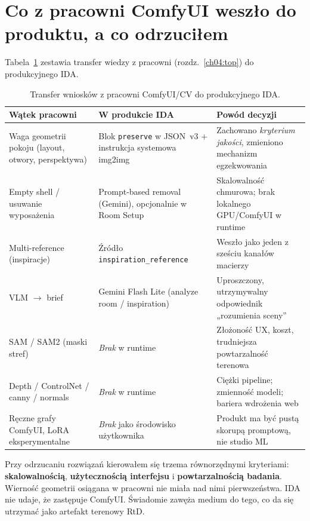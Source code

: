 \section{Co z pracowni ComfyUI weszło do produktu, a co odrzuciłem}
\label{ch07:sec:comfyui-transfer}

Tabela~\ref{tab:ch07:comfyui-transfer} zestawia transfer wiedzy z pracowni (rozdz.~\ref{ch04:top}) do produkcyjnego IDA.

\begin{table}[htbp]
  \centering
  \caption{Transfer wniosków z pracowni ComfyUI/CV do produkcyjnego IDA.}
  \label{tab:ch07:comfyui-transfer}
  \begin{tabular}{@{}p{}p{}p{}@{}}
    \toprule
    Wątek pracowni & W produkcie IDA & Powód decyzji \\
    \midrule
    Waga geometrii pokoju (layout, otwory, perspektywa) &
    Blok \texttt{preserve} w JSON~v3 + instrukcja systemowa img2img &
    Zachowano \emph{kryterium jakości}, zmieniono mechanizm egzekwowania \\
    \addlinespace
    Empty shell / usuwanie wyposażenia &
    Prompt-based removal (Gemini), opcjonalnie w Room Setup &
    Skalowalność chmurowa; brak lokalnego GPU/ComfyUI w runtime \\
    \addlinespace
    Multi-reference (inspiracje) &
    Źródło \texttt{inspiration\_reference} &
    Weszło jako jeden z sześciu kanałów macierzy \\
    \addlinespace
    VLM $\rightarrow$ brief &
    Gemini Flash Lite (analyze room / inspiration) &
    Uproszczony, utrzymywalny odpowiednik „rozumienia sceny” \\
    \addlinespace
    SAM / SAM2 (maski stref) &
    \emph{Brak} w runtime &
    Złożoność UX, koszt, trudniejsza powtarzalność terenowa \\
    \addlinespace
    Depth / ControlNet / canny / normals &
    \emph{Brak} w runtime &
    Ciężki pipeline; zmienność modeli; bariera wdrożenia web \\
    \addlinespace
    Ręczne grafy ComfyUI, LoRA eksperymentalne &
    \emph{Brak} jako środowisko użytkownika &
    Produkt ma być pustą skorupą promptową, nie studio ML \\
    \bottomrule
  \end{tabular}
\end{table}

Przy odrzucaniu rozwiązań kierowałem się trzema równorzędnymi kryteriami: \textbf{skalowalnością}, \textbf{użytecznością interfejsu} i \textbf{powtarzalnością badania}. Wierność geometrii osiągana w pracowni nie miała nad nimi pierwszeństwa. IDA nie udaje, że zastępuje ComfyUI. Świadomie zawęża medium do tego, co da się utrzymać jako artefakt terenowy RtD.

